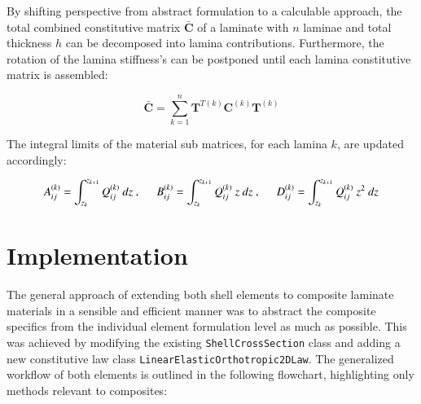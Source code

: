 By shifting perspective from abstract formulation to a calculable approach, the total combined constitutive matrix $\bar{\mathbf{C}}$ of a laminate with $n$ laminae and total thickness $h$ can be decomposed into lamina contributions. Furthermore, the rotation of the lamina stiffness's can be postponed until each lamina constitutive matrix is assembled:

\begin{equation} 
 \bar{\mathbf{C}} = \sum_{k=1}^{n}  \mathbf{T}^{T(k)} {\mathbf{C}}^{(k)}  \mathbf{T}^{(k)}
\label{eqscomp_laminate_form3}
\end{equation}

The integral limits of the material sub matrices, for each lamina $k$, are updated accordingly:

\begin{equation} 
A_{ij}^{(k)} = 
\int_{z_k}^{z_{k+1}}
{Q}_{ij}^{(k)}
\ dz\ ,
\hspace{5mm}
B_{ij}^{(k)} = 
\int_{z_k}^{z_{k+1}}
{Q}_{ij}^{(k)}\ z
\ dz\ ,
\hspace{5mm}
D_{ij}^{(k)} = 
\int_{z_k}^{z_{k+1}}
{Q}_{ij}^{(k)}\ z^2
\ dz
\label{eqscomp_laminate_form4}
\end{equation} 

\section{Implementation}
The general approach of extending both shell elements to composite laminate materials in a sensible and efficient manner was to abstract the composite specifics from the individual element formulation level as much as possible. This was achieved by modifying the existing \texttt{ShellCrossSection} class and adding a new constitutive law class \texttt{LinearElasticOrthotropic2DLaw}. The generalized workflow of both elements is outlined in the following flowchart, highlighting only methods relevant to composites:

